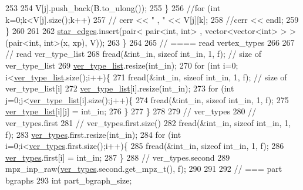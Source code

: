\begin{DoxyCode}
253 
254         V[j].push\_back(B.to\_ulong());
255       \}
256       \textcolor{comment}{//for (int k=0;k<V[j].size();k++)}
257       \textcolor{comment}{//  cerr << " , " << V[j][k];}
258       \textcolor{comment}{//cerr << endl;}
259     \}
260 
261 
262     \hyperlink{classmarked__graph__compressed_a7df5779d313486644132bd816937f532}{star\_edges}.insert(pair< pair<int, int> , vector<vector<int> > > (pair<int, int>(x, xp), V));
263   \}
264 
265   \textcolor{comment}{// ==== read vertex\_types}
266 
267   \textcolor{comment}{// read ver\_type\_list}
268   fread(&int\_in, \textcolor{keyword}{sizeof} int\_in, 1, f); \textcolor{comment}{// size of ver\_type\_list}
269   \hyperlink{classmarked__graph__compressed_af2e3e55223d436628a02758dfae88493}{ver\_type\_list}.resize(int\_in);
270   \textcolor{keywordflow}{for} (\textcolor{keywordtype}{int} i=0; i<\hyperlink{classmarked__graph__compressed_af2e3e55223d436628a02758dfae88493}{ver\_type\_list}.size();i++)\{
271     fread(&int\_in, \textcolor{keyword}{sizeof} int\_in, 1, f); \textcolor{comment}{// size of ver\_type\_list[i]}
272     \hyperlink{classmarked__graph__compressed_af2e3e55223d436628a02758dfae88493}{ver\_type\_list}[i].resize(int\_in);
273     \textcolor{keywordflow}{for} (\textcolor{keywordtype}{int} j=0;j<\hyperlink{classmarked__graph__compressed_af2e3e55223d436628a02758dfae88493}{ver\_type\_list}[i].size();j++)\{
274       fread(&int\_in, \textcolor{keyword}{sizeof} int\_in, 1, f);
275       \hyperlink{classmarked__graph__compressed_af2e3e55223d436628a02758dfae88493}{ver\_type\_list}[i][j] = int\_in;
276     \}
277   \}
278 
279   \textcolor{comment}{// ver\_types}
280   \textcolor{comment}{// ver\_types.first}
281   \textcolor{comment}{// ver\_types.first.size()}
282   fread(&int\_in, \textcolor{keyword}{sizeof} int\_in, 1, f);
283   \hyperlink{classmarked__graph__compressed_af446cc5e23c241a92b76642fd5ebc403}{ver\_types}.first.resize(int\_in);
284   \textcolor{keywordflow}{for} (\textcolor{keywordtype}{int} i=0;i<\hyperlink{classmarked__graph__compressed_af446cc5e23c241a92b76642fd5ebc403}{ver\_types}.first.size();i++)\{
285     fread(&int\_in, \textcolor{keyword}{sizeof} int\_in, 1, f);
286     \hyperlink{classmarked__graph__compressed_af446cc5e23c241a92b76642fd5ebc403}{ver\_types}.first[i] = int\_in;
287   \}
288   \textcolor{comment}{// ver\_types.second}
289   mpz\_inp\_raw(\hyperlink{classmarked__graph__compressed_af446cc5e23c241a92b76642fd5ebc403}{ver\_types}.second.get\_mpz\_t(), f);
290 
291 
292   \textcolor{comment}{// === part bgraphs}
293   \textcolor{keywordtype}{int} part\_bgraph\_size;

\end{DoxyCode}
